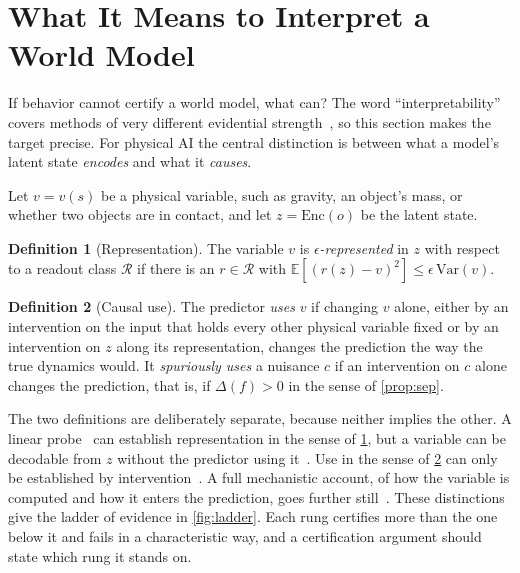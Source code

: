 \documentclass[11pt]{article}
\theoremstyle{definition}\newtheorem{definition}{Definition}
\newcommand{\E}{\mathbb{E}}
\begin{document}
\section{What It Means to Interpret a World Model}\label{sec:interpret}
If behavior cannot certify a world model, what can? The word ``interpretability'' covers methods of very different evidential strength~\citep{doshivelez2017rigorous}, so this section makes the target precise. For physical AI the central distinction is between what a model's latent state \emph{encodes} and what it \emph{causes}.

Let $v=v(s)$ be a physical variable, such as gravity, an object's mass, or whether two objects are in contact, and let $z=\mathrm{Enc}(o)$ be the latent state.

\begin{definition}[Representation]\label{def:rep}
The variable $v$ is \emph{$\epsilon$-represented} in $z$ with respect to a readout class $\mathcal R$ if there is an $r\in\mathcal R$ with $\E[(r(z)-v)^2]\le\epsilon\,\mathrm{Var}(v)$.
\end{definition}

\begin{definition}[Causal use]\label{def:use}
The predictor \emph{uses} $v$ if changing $v$ alone, either by an intervention on the input that holds every other physical variable fixed or by an intervention on $z$ along its representation, changes the prediction the way the true dynamics would. It \emph{spuriously uses} a nuisance $c$ if an intervention on $c$ alone changes the prediction, that is, if $\Delta(f)>0$ in the sense of \cref{prop:sep}.
\end{definition}

The two definitions are deliberately separate, because neither implies the other. A linear probe~\citep{alain2016probes} can establish representation in the sense of \cref{def:rep}, but a variable can be decodable from $z$ without the predictor using it~\citep{belinkov2022probing,elazar2021amnesic}. Use in the sense of \cref{def:use} can only be established by intervention~\citep{geiger2021causal,meng2022rome,wang2023ioi}. A full mechanistic account, of how the variable is computed and how it enters the prediction, goes further still~\citep{olah2020zoom,bricken2023monosemanticity,templeton2024scaling}. These distinctions give the ladder of evidence in \cref{fig:ladder}. Each rung certifies more than the one below it and fails in a characteristic way, and a certification argument should state which rung it stands on.
\end{document}
